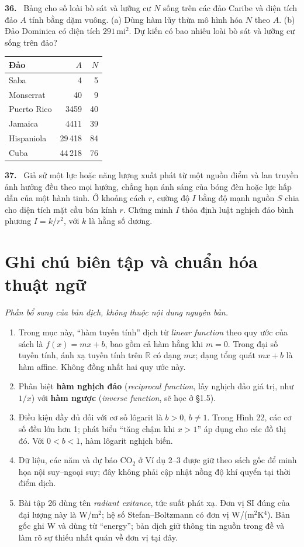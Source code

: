\documentclass[12pt,a4paper]{article}
\newcommand{\bt}[1]{\par\smallskip\noindent\textbf{#1.}\ }
\begin{document}
\bt{36} Bảng cho số loài bò sát và lưỡng cư $N$ sống trên các đảo Caribe và diện tích đảo $A$ tính bằng dặm vuông. (a) Dùng hàm lũy thừa mô hình hóa $N$ theo $A$. (b) Đảo Dominica có diện tích $291\,\mathrm{mi}^2$. Dự kiến có bao nhiêu loài bò sát và lưỡng cư sống trên đảo?
\begin{center}\begin{tabular}{lrr}\toprule Đảo&$A$&$N$\\\midrule
Saba&4&5\\Monserrat&40&9\\Puerto Rico&3459&40\\Jamaica&4411&39\\Hispaniola&29\,418&84\\Cuba&44\,218&76\\\bottomrule\end{tabular}\end{center}
\bt{37} Giả sử một lực hoặc năng lượng xuất phát từ một nguồn điểm và lan truyền ảnh hưởng đều theo mọi hướng, chẳng hạn ánh sáng của bóng đèn hoặc lực hấp dẫn của một hành tinh. Ở khoảng cách $r$, cường độ $I$ bằng độ mạnh nguồn $S$ chia cho diện tích mặt cầu bán kính $r$. Chứng minh $I$ thỏa định luật nghịch đảo bình phương $I=k/r^2$, với $k$ là hằng số dương.

\clearpage
\section*{Ghi chú biên tập và chuẩn hóa thuật ngữ}
\noindent\textit{Phần bổ sung của bản dịch, không thuộc nội dung nguyên bản.}
\begin{enumerate}[leftmargin=*,itemsep=4pt]
\item Trong mục này, ``hàm tuyến tính'' dịch từ \textit{linear function} theo quy ước của sách là $f(x)=mx+b$, bao gồm cả hàm hằng khi $m=0$. Trong đại số tuyến tính, ánh xạ tuyến tính trên $\mathbb R$ có dạng $mx$; dạng tổng quát $mx+b$ là hàm affine. Không đồng nhất hai quy ước này.
\item Phân biệt \textbf{hàm nghịch đảo} (\textit{reciprocal function}, lấy nghịch đảo giá trị, như $1/x$) với \textbf{hàm ngược} (\textit{inverse function}, sẽ học ở §1.5).
\item Điều kiện đầy đủ đối với cơ số lôgarit là $b>0$, $b\ne1$. Trong Hình 22, các cơ số đều lớn hơn 1; phát biểu ``tăng chậm khi $x>1$'' áp dụng cho các đồ thị đó. Với $0<b<1$, hàm lôgarit nghịch biến.
\item Dữ liệu, các năm và dự báo $\mathrm{CO}_2$ ở Ví dụ 2–3 được giữ theo sách gốc để minh họa nội suy–ngoại suy; đây không phải cập nhật nồng độ khí quyển tại thời điểm dịch.
\item Bài tập 26 dùng tên \textit{radiant exitance}, tức suất phát xạ. Đơn vị SI đúng của đại lượng này là W/m$^2$; hệ số Stefan–Boltzmann có đơn vị W/(m$^2$K$^4$). Bản gốc ghi W và dùng từ ``energy''; bản dịch giữ thông tin nguồn trong đề và làm rõ sự thiếu nhất quán về đơn vị tại đây.
\end{enumerate}
\end{document}
